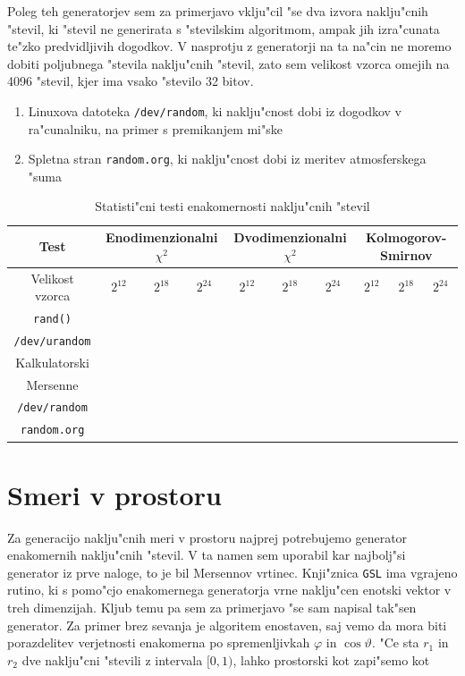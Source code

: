 \documentclass[a4paper,10pt]{article}
\begin{document}
Poleg teh generatorjev sem za primerjavo vklju"cil "se dva izvora naklju"cnih "stevil, ki "stevil ne generirata s "stevilskim algoritmom, ampak jih izra"cunata te"zko predvidljivih dogodkov. V nasprotju z generatorji na ta na"cin ne moremo dobiti poljubnega "stevila naklju"cnih "stevil, zato sem velikost vzorca omejih na 4096 "stevil, kjer ima vsako "stevilo 32 bitov.

\begin{enumerate}
 \item Linuxova datoteka \texttt{/dev/random}, ki naklju"cnost dobi iz dogodkov v ra"cunalniku, na primer s premikanjem mi"ske
 \item Spletna stran \texttt{random.org}, ki naklju"cnost dobi iz meritev atmosferskega "suma
\end{enumerate}

\begin{table}[h]
 \centering
  \begin{tabular}{|c|c|c|c|c|c|c|c|c|c|}
  \hline
  Test & \multicolumn{3}{|c|}{Enodimenzionalni $\chi^2$} & \multicolumn{3}{|c|}{Dvodimenzionalni $\chi^2$} & \multicolumn{3}{|c|}{Kolmogorov-Smirnov} \\
  \hline
  Velikost vzorca & $2^{12}$ & $2^{18}$ & $2^{24}$ & $2^{12}$ & $2^{18}$ & $2^{24}$ & $2^{12}$ & $2^{18}$ & $2^{24}$ \\
  \hline
  \texttt{rand()} & \\
  \texttt{/dev/urandom} & \\
  Kalkulatorski & \\
  Mersenne & \\
\hline
  \texttt{/dev/random} & \\
  \texttt{random.org} & \\
\hline
   
  \end{tabular}
\caption{Statisti"cni testi enakomernosti naklju"cnih "stevil}
\end{table}

\section{Smeri v prostoru}

Za generacijo naklju"cnih meri v prostoru najprej potrebujemo generator enakomernih naklju"cnih "stevil. V ta namen sem uporabil kar najbolj"si generator iz prve naloge, to je bil Mersennov vrtinec. Knji"znica \texttt{GSL} ima vgrajeno rutino, ki s pomo"cjo enakomernega generatorja vrne naklju"cen enotski vektor v treh dimenzijah. Kljub temu pa sem za primerjavo "se sam napisal tak"sen generator. Za primer brez sevanja je algoritem enostaven, saj vemo da mora biti porazdelitev verjetnosti enakomerna po spremenljivkah $\varphi$ in $\cos\vartheta$. "Ce sta $r_1$ in $r_2$ dve naklju"cni "stevili z intervala $[0,1)$, lahko prostorski kot zapi"semo kot
\end{document}
